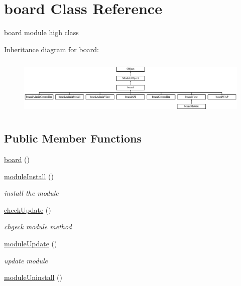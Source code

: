 \hypertarget{classboard}{\section{board Class Reference}
\label{classboard}
}


board module high class  


Inheritance diagram for board\-:\begin{figure}[H]
\begin{center}
\leavevmode
\includegraphics[height=2.777778cm]{classboard}
\end{center}
\end{figure}
\subsection*{Public Member Functions}
\begin{DoxyCompactItemize}
\item 
\hyperlink{classboard_a2a97f34e7c9ed8ace6a2508bb2c6e2a2}{board} ()
\item 
\hyperlink{classboard_abcf015f709c0c2809dba55f74f059ebc}{module\-Install} ()
\begin{DoxyCompactList}\small\item\em install the module \end{DoxyCompactList}\item 
\hyperlink{classboard_a64506bb5293024e146d0ff7deeb27684}{check\-Update} ()
\begin{DoxyCompactList}\small\item\em chgeck module method \end{DoxyCompactList}\item 
\hyperlink{classboard_ab6b25ead0f4ec6d25f60338c7cdd33b5}{module\-Update} ()
\begin{DoxyCompactList}\small\item\em update module \end{DoxyCompactList}\item 
\hyperlink{classboard_a1e6008fcf4e2a540370e242246b8e721}{module\-Uninstall} ()
\end{DoxyCompactItemize}
